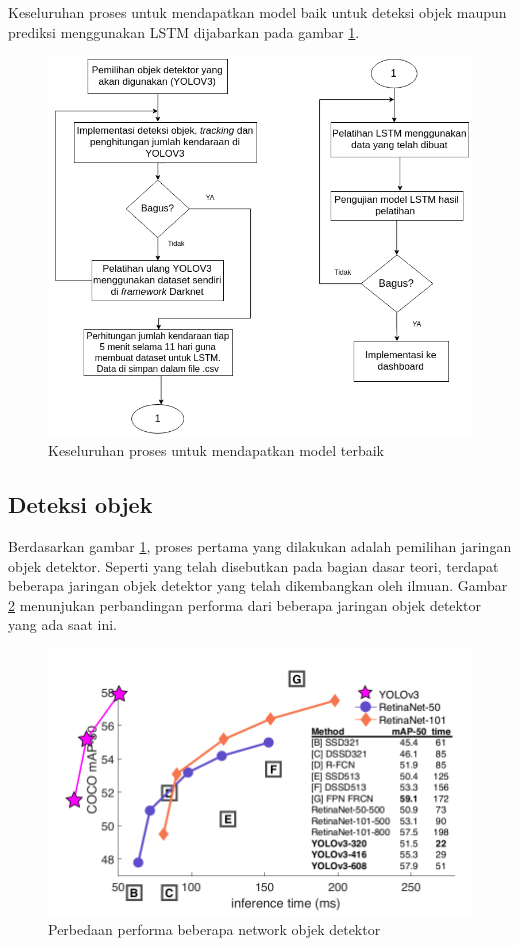 \documentclass[conference]{IEEEtran}
\begin{document}
Keseluruhan proses untuk mendapatkan model baik untuk deteksi objek maupun prediksi menggunakan LSTM dijabarkan pada gambar \ref{get_model_scheme}.
\begin{figure}[htp]
	\centering
	\includegraphics[scale=0.4]{Get_Model_Scheme}
	\caption{Keseluruhan proses untuk mendapatkan model terbaik}
	\label{get_model_scheme}
\end{figure}

\subsection{Deteksi objek}
Berdasarkan gambar \ref{get_model_scheme}, proses pertama yang dilakukan adalah pemilihan jaringan objek detektor. Seperti yang telah disebutkan pada bagian dasar teori, terdapat beberapa jaringan objek detektor yang telah dikembangkan oleh ilmuan. 
Gambar \ref{yolo_comparison} menunjukan perbandingan performa dari beberapa jaringan objek detektor yang ada saat ini.
\begin{figure}
	\centering
	\includegraphics[scale=0.4]{YOLO_Comparison}
	\caption{Perbedaan performa beberapa network objek detektor}
	\label{yolo_comparison}
\end{figure}
\end{document}
